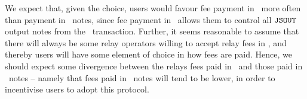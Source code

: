 We expect that, given the choice, users would favour fee payment in \ether~more often than payment in \zeth~notes, since fee payment in \ether~allows them to control all $\mathtt{JSOUT}$ output notes from the \zeth~transaction. Further, it seems reasonable to assume that there will always be some relay operators willing to accept relay fees in \ether, and thereby users will have some element of choice in how fees are paid. Hence, we should expect some divergence between the relays fees paid in \ether~and those paid in \zeth~notes -- namely that fees paid in \zeth~notes will tend to be lower, in order to incentivise users to adopt this protocol.
